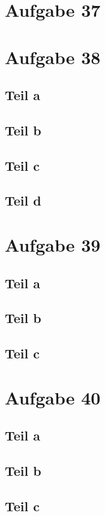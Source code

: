 \documentclass[10pt,a4paper]{article}
\begin{document}
\section{Aufgabe 37}



\section{Aufgabe 38}

\subsection{Teil a}

\subsection{Teil b}

\subsection{Teil c}

\subsection{Teil d}

\section{Aufgabe 39}

\subsection{Teil a}

\subsection{Teil b}

\subsection{Teil c}

\section{Aufgabe 40}

\subsection{Teil a}

\subsection{Teil b}

\subsection{Teil c}
\end{document}
